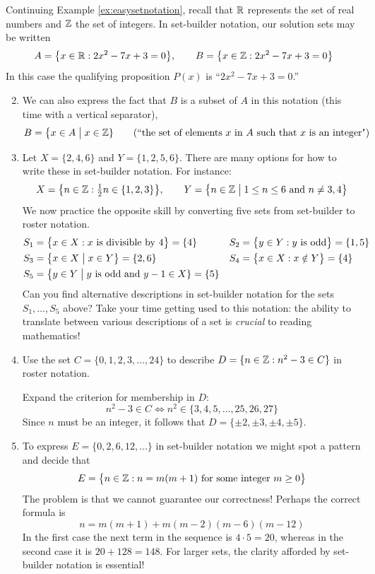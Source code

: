 \begin{examples}{}{}
\exstart Continuing Example \ref{ex:easysetnotation}, recall that $\mathbb{R}$ represents the set of real numbers and $\mathbb{Z}$ the set of integers. In set-builder notation, our solution sets may be written
	\[A=\bigl\{x\in\mathbb{R}:2x^2-7x+3=0\bigr\},\qquad B=\bigl\{x\in\mathbb{Z}:2x^2-7x+3=0\bigr\}\]
	In this case the qualifying proposition $P(x)$ is ``$2x^2-7x+3=0$.''
	\begin{enumerate}\setcounter{enumi}{1}
	  \item[]We can also express the fact that $B$ is a subset of $A$ in this notation (this time with a vertical separator),
	\[B=\bigl\{x\in A\bigm| x\in\mathbb{Z}\} \tag{``the set of elements $x$ in $A$ such that $x$ is an integer"}\]
	
	\item Let $X=\{2,4,6\}$ and $Y=\{1,2,5,6\}$. There are many options for how to write these in set-builder notation. For instance:
	\[
		X=\bigl\{n\in\mathbb{Z}:\tfrac 12n\in\{1,2,3\}\bigr\},\qquad Y=\bigl\{n\in\mathbb{Z}\bigm|1\le n\le 6\text{ and }n\neq 3,4\bigr\}
	\]
	We now practice the opposite skill by converting five sets from set-builder to roster notation.
	\begin{align*}
		&S_1=\bigl\{x\in X:x\text{ is divisible by 4}\bigr\}=\{4\}
		&&
		S_2=\bigl\{y\in Y:y\text{ is odd}\bigr\}=\{1,5\}
		\\
		&S_3=\bigl\{x\in X\bigm| x\in Y\bigr\}=\{2,6\}
		&&
		S_4=\bigl\{x\in X:x\notin Y\bigr\}=\{4\}
		\\
		&S_5=\bigl\{y\in Y\bigm| y\text{ is odd and $y-1\in X$}\}=\{5\}
	\end{align*}
	Can you find alternative descriptions in set-builder notation for the sets $S_1,\ldots,S_5$ above? Take your time getting used to this notation: the ability to translate between various descriptions of a set is \emph{crucial} to reading mathematics!
	
	\item Use the set $C=\{0,1,2,3,\ldots,24\}$ to describe $D=\{n\in\mathbb{Z}:n^2-3\in C\}$ in roster notation.\par
  Expand the criterion for membership in $D$:
  \[
  	n^2-3\in C\iff n^2\in\bigl\{3,4,5,\ldots,25,26,27\bigr\}
  \]
  Since $n$ must be an integer, it follows that $D=\{\pm 2,\pm 3,\pm 4,\pm 5\}$.
  
  \item To express $E=\{0,2,6,12,\ldots\}$ in set-builder notation we might spot a pattern and decide that
  \[
  	E=\bigl\{n\in\mathbb{Z}: n=m(m+1) \text{ for some integer }m\ge 0\bigr\}
  \]
  The problem is that we cannot guarantee our correctness! Perhaps the correct formula is
  \[
  	n=m(m+1)+m(m-2)(m-6)(m-12)
  \]
	In the first case the next term in the sequence is $4\cdot 5=20$, whereas in the second case it is $20+128=148$. For larger sets, the clarity afforded by set-builder notation is essential!

	\end{enumerate}
\end{examples}



